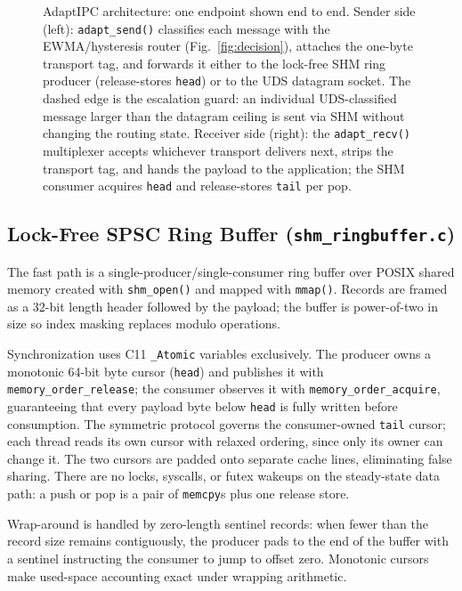 \documentclass[conference]{IEEEtran}
\begin{document}
\begin{figure}[t]
{}%
\caption{AdaptIPC architecture: one endpoint shown end to end. Sender side
(left): \texttt{adapt\_send()} classifies each message with the
EWMA/hysteresis router (Fig.~\ref{fig:decision}), attaches the one-byte
transport tag, and forwards it either to the lock-free SHM ring producer
(release-stores \texttt{head}) or to the UDS datagram socket. The dashed
edge is the escalation guard: an individual UDS-classified message larger
than the datagram ceiling is sent via SHM without changing the routing
state. Receiver side (right): the \texttt{adapt\_recv()} multiplexer
accepts whichever transport delivers next, strips the transport tag, and
hands the payload to the application; the SHM consumer acquires
\texttt{head} and release-stores \texttt{tail} per pop.}
\label{fig:arch}
\end{figure}


\subsection{Lock-Free SPSC Ring Buffer (\texttt{shm\_ringbuffer.c})}
The fast path is a single-producer/single-consumer ring buffer over POSIX
shared memory created with \texttt{shm\_open()} and mapped with
\texttt{mmap()}. Records are framed as a 32-bit length header followed by the
payload; the buffer is power-of-two in size so index masking replaces modulo
operations.

Synchronization uses C11 \texttt{\_Atomic} variables exclusively. The
producer owns a monotonic 64-bit byte cursor (\texttt{head}) and publishes it
with \texttt{memory\_order\_release}; the consumer observes it with
\texttt{memory\_order\_acquire}, guaranteeing that every payload byte below
\texttt{head} is fully written before consumption. The symmetric protocol
governs the consumer-owned \texttt{tail} cursor; each thread reads its own
cursor with relaxed ordering, since only its owner can change it. The two
cursors are padded onto separate cache lines, eliminating false sharing.
There are no locks, syscalls, or futex wakeups on the steady-state data path:
a push or pop is a pair of \texttt{memcpy}s plus one release store.

Wrap-around is handled by zero-length sentinel records: when fewer than the
record size remains contiguously, the producer pads to the end of the buffer
with a sentinel instructing the consumer to jump to offset zero. Monotonic
cursors make used-space accounting exact under wrapping arithmetic.
\end{document}
